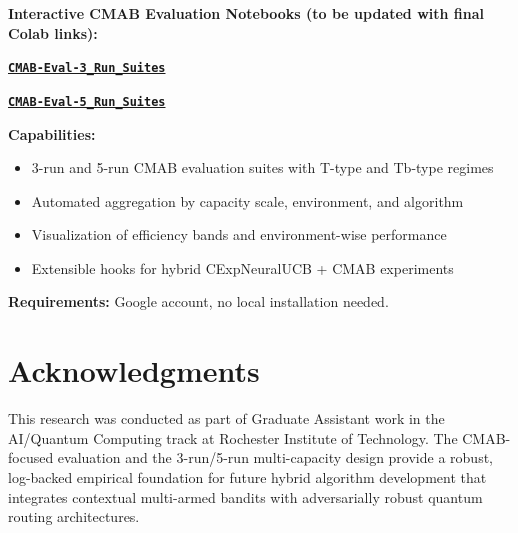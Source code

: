 \documentclass[12pt,a4paper]{article}
\newcommand{\colab}[1]{\textcolor{colabcolor}{\textbf{#1}}}
\begin{document}
\begin{tcolorbox}[colback=colabcolor!20,colframe=colabcolor,title=\textbf{Interactive Framework Access (Placeholder Links)}]

\begin{center}
\textbf{Interactive CMAB Evaluation Notebooks (to be updated with final Colab links):}
\vspace{0.3cm}

\href{https://colab.research.google.com/drive/PLACEHOLDER_3_RUNS}{\colab{\texttt{CMAB-Eval-3\_Run\_Suites}}}

\href{https://colab.research.google.com/drive/PLACEHOLDER_5_RUNS}{\colab{\texttt{CMAB-Eval-5\_Run\_Suites}}}

\vspace{0.3cm}
\textbf{Capabilities:}
\begin{itemize}
\item 3-run and 5-run CMAB evaluation suites with T-type and Tb-type regimes
\item Automated aggregation by capacity scale, environment, and algorithm
\item Visualization of efficiency bands and environment-wise performance
\item Extensible hooks for hybrid CExpNeuralUCB + CMAB experiments
\end{itemize}

\textbf{Requirements:} Google account, no local installation needed.
\end{center}
\end{tcolorbox}

\section{Acknowledgments}

This research was conducted as part of Graduate Assistant work in the AI/Quantum Computing track at Rochester Institute of Technology. The CMAB-focused evaluation and the 3-run/5-run multi-capacity design provide a robust, log-backed empirical foundation for future hybrid algorithm development that integrates contextual multi-armed bandits with adversarially robust quantum routing architectures.
\end{document}

